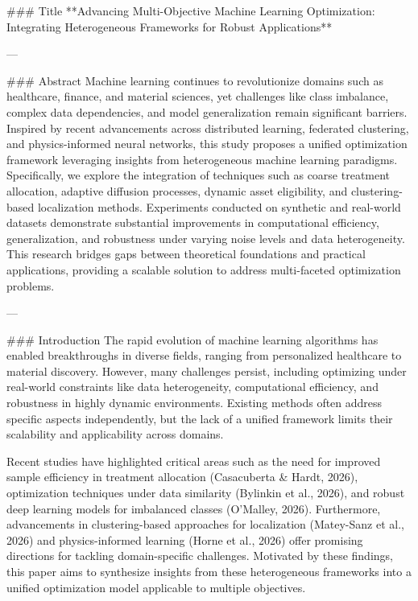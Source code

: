 ### Title  
**Advancing Multi-Objective Machine Learning Optimization: Integrating Heterogeneous Frameworks for Robust Applications**

---

### Abstract  
Machine learning continues to revolutionize domains such as healthcare, finance, and material sciences, yet challenges like class imbalance, complex data dependencies, and model generalization remain significant barriers. Inspired by recent advancements across distributed learning, federated clustering, and physics-informed neural networks, this study proposes a unified optimization framework leveraging insights from heterogeneous machine learning paradigms. Specifically, we explore the integration of techniques such as coarse treatment allocation, adaptive diffusion processes, dynamic asset eligibility, and clustering-based localization methods. Experiments conducted on synthetic and real-world datasets demonstrate substantial improvements in computational efficiency, generalization, and robustness under varying noise levels and data heterogeneity. This research bridges gaps between theoretical foundations and practical applications, providing a scalable solution to address multi-faceted optimization problems.

---

### Introduction  
The rapid evolution of machine learning algorithms has enabled breakthroughs in diverse fields, ranging from personalized healthcare to material discovery. However, many challenges persist, including optimizing under real-world constraints like data heterogeneity, computational efficiency, and robustness in highly dynamic environments. Existing methods often address specific aspects independently, but the lack of a unified framework limits their scalability and applicability across domains.  

Recent studies have highlighted critical areas such as the need for improved sample efficiency in treatment allocation (Casacuberta & Hardt, 2026), optimization techniques under data similarity (Bylinkin et al., 2026), and robust deep learning models for imbalanced classes (O'Malley, 2026). Furthermore, advancements in clustering-based approaches for localization (Matey-Sanz et al., 2026) and physics-informed learning (Horne et al., 2026) offer promising directions for tackling domain-specific challenges. Motivated by these findings, this paper aims to synthesize insights from these heterogeneous frameworks into a unified optimization model applicable to multiple objectives.

